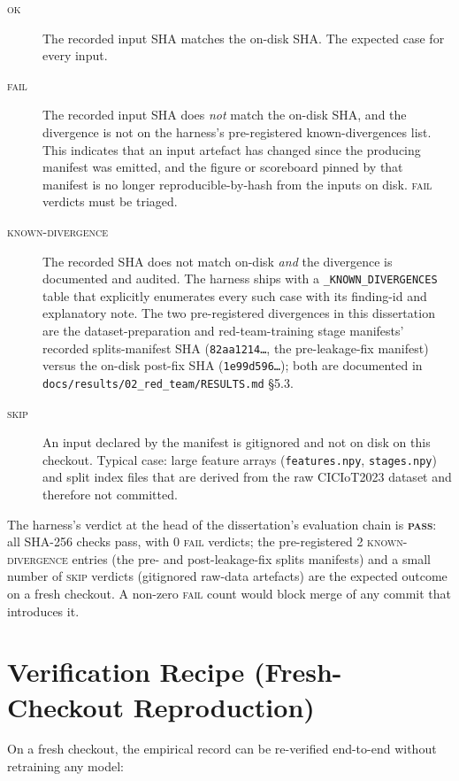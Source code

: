 \begin{description}
    \item[\textsc{ok}] The recorded input SHA matches the on-disk SHA. The expected case for every input.
    \item[\textsc{fail}] The recorded input SHA does \emph{not} match the on-disk SHA, and the divergence is not on the harness's pre-registered known-divergences list. This indicates that an input artefact has changed since the producing manifest was emitted, and the figure or scoreboard pinned by that manifest is no longer reproducible-by-hash from the inputs on disk. \textsc{fail} verdicts must be triaged.
    \item[\textsc{known-divergence}] The recorded SHA does not match on-disk \emph{and} the divergence is documented and audited. The harness ships with a \texttt{\_KNOWN\_DIVERGENCES} table that explicitly enumerates every such case with its finding-id and explanatory note. The two pre-registered divergences in this dissertation are the dataset-preparation and red-team-training stage manifests' recorded splits-manifest SHA (\texttt{82aa1214\ldots}, the pre-leakage-fix manifest) versus the on-disk post-fix SHA (\texttt{1e99d596\ldots}); both are documented in \texttt{docs/results/02\_red\_team/RESULTS.md} \S5.3.
    \item[\textsc{skip}] An input declared by the manifest is gitignored and not on disk on this checkout. Typical case: large feature arrays (\texttt{features.npy}, \texttt{stages.npy}) and split index files that are derived from the raw CICIoT2023 dataset and therefore not committed.
\end{description}

The harness's verdict at the head of the dissertation's evaluation chain is \textbf{\textsc{pass}}: all SHA-256 checks pass, with 0 \textsc{fail} verdicts; the pre-registered 2 \textsc{known-divergence} entries (the pre- and post-leakage-fix splits manifests) and a small number of \textsc{skip} verdicts (gitignored raw-data artefacts) are the expected outcome on a fresh checkout. A non-zero \textsc{fail} count would block merge of any commit that introduces it.

\section{Verification Recipe (Fresh-Checkout Reproduction)}\label{app:recipe}
On a fresh checkout, the empirical record can be re-verified end-to-end without retraining any model:

